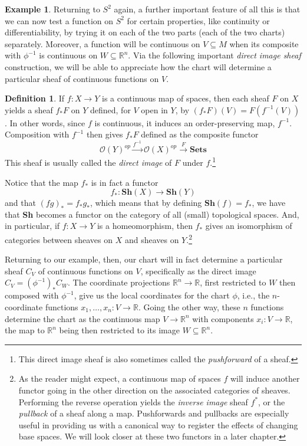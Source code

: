 \documentclass[a4paper]{book}
\theoremstyle{definition}
\newtheorem{example}{Example}[section]
\theoremstyle{definition}
\newtheorem{definition}{Definition}[section]
\theoremstyle{definition}
\theoremstyle{theorem}
\theoremstyle{definition}
\begin{document}
\begin{example}
		Returning to $S^2$ again, a further important feature of all this is that we can now test a function on $S^2$ for certain properties, like continuity or differentiability, by trying it on each of the two parts (each of the two charts) separately. Moreover, a function will be continuous on $V \subseteq M$ when its composite with $\phi^{-1}$ is continuous on $W \subseteq \mathbb{R}^n$. Via the following important \textit{direct image sheaf} construction, we will be able to appreciate how the chart will determine a particular sheaf of continuous functions on $V$. 
		\begin{definition}
			If $f: X \rightarrow Y$ is a continuous map of spaces, then each sheaf $F$ on $X$ yields a sheaf $f_{*}F$ on $Y$ defined, for $V$ open in $Y$, by $(f_{*}F) (V) = F(f^{-1}(V))$. In other words, since $f$ is continuous, it induces an order-preserving map, $f^{-1}$. Composition with $f^{-1}$ then gives $f_{*}F$ defined as the composite functor 
			\begin{equation}
			\mathscr{O}(Y)^{op} \xrightarrow{f^{-1}} \mathscr{O}(X)^{op} \xrightarrow{F} \textbf{Sets}
			\end{equation}
			This sheaf is usually called the \textit{direct image} of $F$ under $f$.\footnote{This direct image sheaf is also sometimes called the \textit{pushforward} of a sheaf.} 
		\end{definition} \noindent 
		Notice that the map $f_{*}$ is in fact a functor 
		\begin{equation}
		f_{*}: \textbf{Sh}(X) \rightarrow \textbf{Sh}(Y)
		\end{equation}
		and that $(fg)_{*} = f_* g_*$, which means that by defining $\textbf{Sh}(f) = f_*$, we have that \textbf{Sh} becomes a functor on the category of all (small) topological spaces. And, in particular, if $f: X \rightarrow Y$ is a homeomorphism, then $f_*$ gives an isomorphism of categories between sheaves on $X$ and sheaves on $Y$.\footnote{As the reader might expect, a continuous map of spaces $f$ will induce another functor going in the other direction on the associated categories of sheaves. Performing the reverse operation yields the \textit{inverse image} sheaf $f^*$, or the \textit{pullback} of a sheaf along a map. Pushforwards and pullbacks are especially useful in providing us with a canonical way to register the effects of changing base spaces. We will look closer at these two functors in a later chapter.} \par 
		Returning to our example, then, our chart will in fact determine a particular sheaf $C_V$ of continuous functions on $V$, specifically as the direct image $C_V = (\phi^{-1})_* C_W$. The coordinate projections $\mathbb{R}^n \rightarrow \mathbb{R}$, first restricted to $W$ then composed with $\phi^{-1}$, give us the local coordinates for the chart $\phi$, i.e., the $n$-coordinate functions $x_1, \dots, x_n: V \rightarrow \mathbb{R}$. Going the other way, these $n$ functions determine the chart as the continuous map $V \rightarrow \mathbb{R}^n$ with components $x_i: V \rightarrow \mathbb{R}$, the map to $\mathbb{R}^n$ being then restricted to its image $W \subseteq \mathbb{R}^n$. \par 

\end{example}
\end{document}
